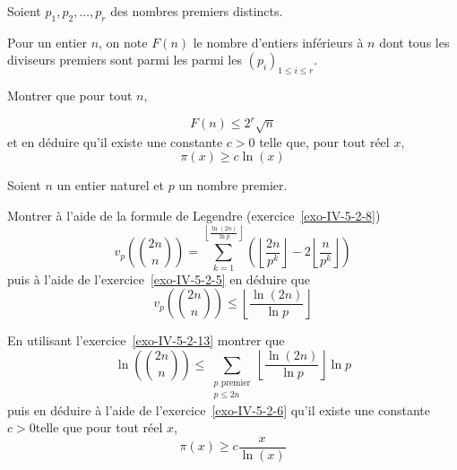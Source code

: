 \begin{exo}
Soient $p_1, p_2, \ldots, p_r$ des nombres premiers distincts.

Pour un entier $n$, on note $F(n)$ le nombre d'entiers inférieurs à $n$ dont tous les diviseurs premiers sont parmi les parmi les $(p_i)_{1 \le i \le r}$.

Montrer que pour tout $n$,

$$F(n) \le 2^r \sqrt n$$
et en déduire qu'il existe une constante $c>0$ telle que, pour tout réel $x$,
$$\pi(x) \ge c \ln(x)$$
\end{exo}

\begin{exo}
Soient $n$ un entier naturel et $p$ un nombre premier.

Montrer à l'aide de la formule de Legendre (exercice~\ref{exo-IV-5-2-8})
$$v_p\left( \binom{2n} n\right) = \sum_{k=1}^{\left\lfloor \frac{\ln(2n)}{\ln p} \right\rfloor} \left(\left\lfloor \frac{2n}{p^k} \right\rfloor - 2 \left\lfloor \frac n{p^k} \right\rfloor  \right)$$
puis à l'aide de l'exercice~\ref{exo-IV-5-2-5} en déduire que
$$v_p\left( \binom{2n} n\right) \le \left\lfloor \frac{\ln(2n)}{\ln p} \right\rfloor$$
\end{exo}

\begin{exo}
    En utilisant l'exercice~\ref{exo-IV-5-2-13} montrer que
    $$\ln \left( \binom{2n} n\right) \le \sum_{\substack{p \text{ premier} \\ p \le 2n }} \left\lfloor \frac{\ln(2n)}{\ln p} \right\rfloor \ln p$$ puis en déduire à l'aide de l'exercice~\ref{exo-IV-5-2-6} qu'il existe une constante $c>0$telle que pour tout réel $x$,
    $$\pi(x) \ge c \frac{x}{\ln(x)}$$
\end{exo}


